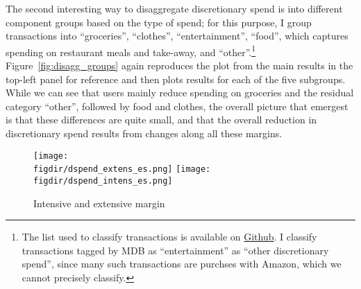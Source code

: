 The second interesting way to disaggregate discretionary spend is into
different component groups based on the type of spend; for this purpose, I
group transactions into ``groceries'', ``clothes'', ``entertainment'',
``food'', which captures spending on restaurant meals and take-away, and
``other''.\footnote{The list used to classify transactions is available on
    \href{https://github.com/fabiangunzinger/mdb_eval/blob/f31bfcd7a330188cdd27968d41957ebf5b454099/src/data/aggregators.py\#L389}{Github}.
    I classify transactions tagged by MDB as ``entertainment'' as ``other
discretionary spend'', since many such transactions are purchses with Amazon,
which we cannot precisely classify.} Figure~\ref{fig:disagg_groups} again
reproduces the plot from the main results in the top-left panel for reference
and then plots results for each of the five subgroups. While we can see that users
mainly reduce spending on groceries and the residual category ``other'',
followed by food and clothes, the overall picture that emergest is that these
differences are quite small, and that the overall reduction in discretionary
spend results from changes along all these margins.

\begin{figure}[h]
    \centering
    \caption{Intensive and extensive margin}%
    \label{fig:int_ext_results}
    \texttt{[image: \\figdir/dspend\_extens\_es.png]}
    \texttt{[image: \\figdir/dspend\_intens\_es.png]}
\end{figure}

